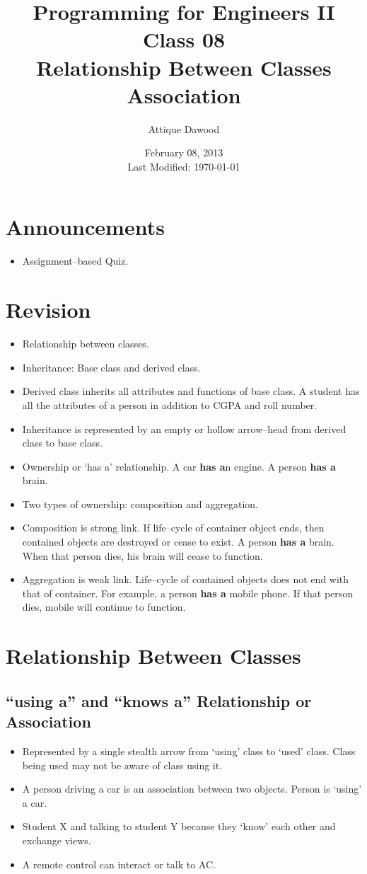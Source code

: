 \documentclass[12pt,a4paper]{article}
\title{\vspace{-2cm}Programming for Engineers II\\Class 08\\Relationship Between Classes\\Association}
\author{Attique Dawood}
\date{February 08, 2013\\[0.2cm] Last Modified: \today}
\begin{document}
\maketitle
\section{Announcements}
\begin{itemize}
\item Assignment--based Quiz.
\end{itemize}
\section{Revision}
\begin{itemize}
\item Relationship between classes.
\item Inheritance: Base class and derived class.
\item Derived class inherits all attributes and functions of base class. A student has all the attributes of a person in addition to CGPA and roll number.
\item Inheritance is represented by an empty or hollow arrow--head from derived class to base class.
\item Ownership or `has a' relationship. A car \textbf{has a}n engine. A person \textbf{has a} brain.
\item Two types of ownership: composition and aggregation.
\item Composition is strong link. If life--cycle of container object ends, then contained objects are destroyed or cease to exist. A person \textbf{has a} brain. When that person dies, his brain will cease to function.
\item Aggregation is weak link. Life--cycle of contained objects does not end with that of container. For example, a person \textbf{has a} mobile phone. If that person dies, mobile will continue to function.
\end{itemize}
\section{Relationship Between Classes}
\subsection{``using a'' and ``knows a'' Relationship or Association}
\begin{itemize}
\item Represented by a single stealth arrow from `using' class to `used' class. Class being used may not be aware of class using it.
\item A person driving a car is an association between two objects. Person is `using' a car.
\item Student X and talking to student Y because they `know' each other and exchange views.
\item A remote control can interact or talk to AC.
\end{itemize}
\nocite{*}


\end{document}
